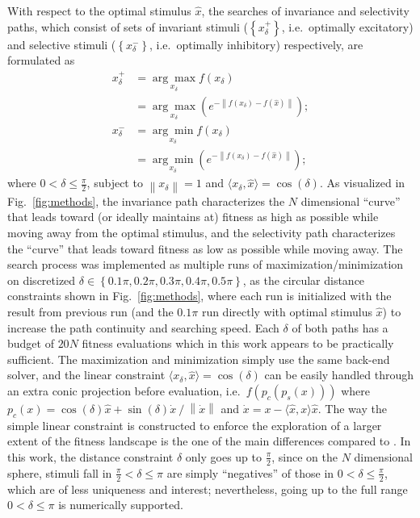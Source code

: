 With respect to the optimal stimulus $\hat{x}$, the searches of invariance and selectivity paths, which consist of sets of invariant stimuli ($\left\lbrace x^{+}_{\delta} \right\rbrace$, i.e.~optimally excitatory) and selective stimuli ($\left\lbrace x^{-}_{\delta} \right\rbrace$, i.e.~optimally inhibitory) respectively, are formulated as
\begin{align}
x^{+}_{\delta} &= \underset{x_{\delta}}{\arg\max} f\left(x_{\delta}\right) \label{eq:I1} \\
&= \underset{x_{\delta}}{\arg\max} \left( e^{-\left\|f\left(x_{\delta}\right)-f\left(\hat{x}\right)\right\|} \right); \label{eq:I2} \\
x^{-}_{\delta} &= \underset{x_{\delta}}{\arg\min} f\left(x_{\delta}\right) \label{eq:S1} \\
&= \underset{x_{\delta}}{\arg\min} \left( e^{-\left\|f\left(x_{\delta}\right)-f\left(\hat{x}\right)\right\|} \right); \label{eq:S2}
\end{align}
where $0 < \delta \le \frac{\pi}{2}$, subject to $\left\| x_{\delta} \right\| = 1$ and $\langle x_{\delta} , \hat{x} \rangle = \cos\left(\delta\right)$. As visualized in Fig.~\ref{fig:methods}, the invariance path characterizes the $N$ dimensional ``curve'' that leads toward (or ideally maintains at) fitness as high as possible while moving away from the optimal stimulus, and the selectivity path characterizes the ``curve'' that leads toward fitness as low as possible while moving away. The search process was implemented as multiple runs of maximization/minimization on discretized $\delta \in \left\lbrace 0.1\pi, 0.2\pi, 0.3\pi, 0.4\pi, 0.5\pi\right\rbrace$, as the circular distance constraints shown in Fig.~\ref{fig:methods}, where each run is initialized with the result from previous run (and the $0.1\pi$ run directly with optimal stimulus $\hat{x}$) to increase the path continuity and searching speed. Each $\delta$ of both paths has a budget of $20N$ fitness evaluations which in this work appears to be practically sufficient. The maximization and minimization simply use the same back-end solver, and the linear constraint $\langle x_{\delta} , \hat{x} \rangle = \cos\left(\delta\right)$ can be easily handled through an extra conic projection before evaluation, i.e.~$f\left(p_c\left(p_s\left(x\right)\right)\right)$ where $p_c\left(x\right) = \cos\left(\delta\right)\hat{x} + \sin\left(\delta\right)\dot{x} \mathbin{/} \left\|\dot{x}\right\|$ and $\dot{x} = x - \langle\hat{x},x\rangle \hat{x}$. The way the simple linear constraint is constructed to enforce the exploration of a larger extent of the fitness landscape is the one of the main differences compared to \cite{erhan2010understanding}.
In this work, the distance constraint $\delta$ only goes up to $\frac{\pi}{2}$, since on the $N$ dimensional sphere, stimuli fall in $\frac{\pi}{2} < \delta \le \pi$ are simply ``negatives'' of those in $0 < \delta \le \frac{\pi}{2}$, which are of less uniqueness and interest; nevertheless, going up to the full range $0 < \delta \le \pi$ is numerically supported.

